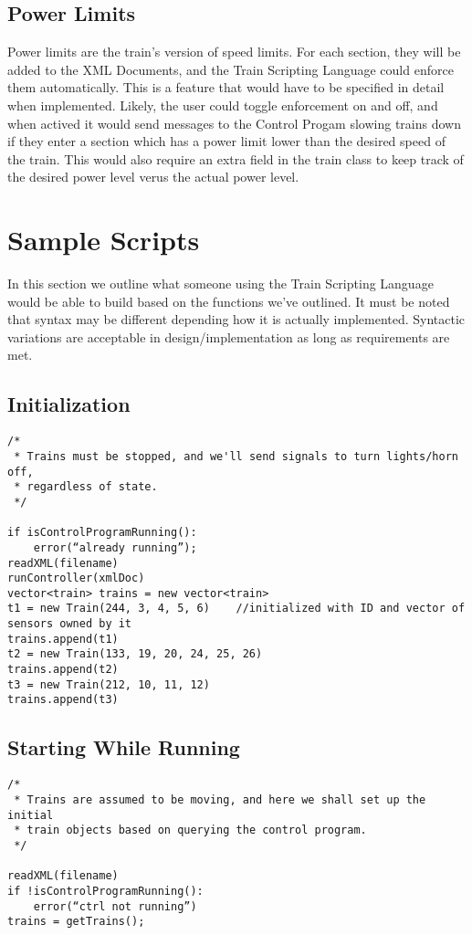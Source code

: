 \documentclass[a4paper,11pt,notitlepage]{article}
\def\TSL{Train Scripting Language\xspace}
\def\CS{Control Progam\xspace}
\begin{document}
\subsection{Power Limits}
Power limits are the train's version of speed limits. For each section, they will be added to the XML Documents, and the \TSL could enforce them automatically. This is a feature that would have to be specified in detail when implemented. Likely, the user could toggle enforcement on and off, and when actived it would send messages to the \CS slowing trains down if they enter a section which has a power limit lower than the desired speed of the train. This would also require an extra field in the train class to keep track of the desired power level verus the actual power level.

\newpage
\section{Sample Scripts}
In this section we outline what someone using the \TSL would be able to build based on the functions we've outlined. It must be noted that syntax may be different depending how it is actually implemented. Syntactic variations are acceptable in design/implementation as long as requirements are met.

\subsection{Initialization}
\begin{verbatim}
/*
 * Trains must be stopped, and we'll send signals to turn lights/horn off,
 * regardless of state.
 */

if isControlProgramRunning():
    error(“already running”);
readXML(filename)
runController(xmlDoc)
vector<train> trains = new vector<train>
t1 = new Train(244, 3, 4, 5, 6)    //initialized with ID and vector of sensors owned by it
trains.append(t1)
t2 = new Train(133, 19, 20, 24, 25, 26)
trains.append(t2)
t3 = new Train(212, 10, 11, 12)
trains.append(t3)
\end{verbatim}

\subsection{Starting While Running}
\begin{verbatim}
/*
 * Trains are assumed to be moving, and here we shall set up the initial
 * train objects based on querying the control program.
 */

readXML(filename)
if !isControlProgramRunning():
    error(“ctrl not running”)
trains = getTrains();
\end{verbatim}
\end{document}
